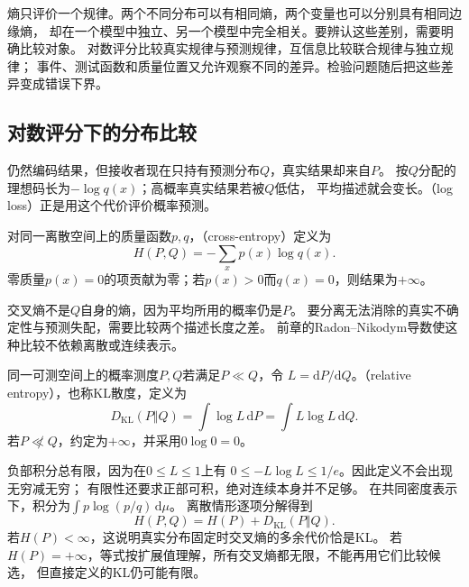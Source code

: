 熵只评价一个规律。两个不同分布可以有相同熵，两个变量也可以分别具有相同边缘熵，
却在一个模型中独立、另一个模型中完全相关。要辨认这些差别，需要明确比较对象。
对数评分比较真实规律与预测规律，互信息比较联合规律与独立规律；
事件、测试函数和质量位置又允许观察不同的差异。检验问题随后把这些差异变成错误下界。

\subsection{对数评分下的分布比较}
\label{sec:information-log-score-kl}

仍然编码结果，但接收者现在只持有预测分布\(Q\)，真实结果却来自\(P\)。
按\(Q\)分配的理想码长为\(-\log q(x)\)；高概率真实结果若被\(Q\)低估，
平均描述就会变长。（log loss）正是用这个代价评价概率预测。

\begin{definition}[离散交叉熵]
\label{def:information-cross-entropy}
对同一离散空间上的质量函数\(p,q\)，（cross-entropy）定义为
\begin{equation}
  H(P,Q)=-\sum_xp(x)\log q(x).
  \label{eq:information-cross-entropy}
\end{equation}
零质量\(p(x)=0\)的项贡献为零；若\(p(x)>0\)而\(q(x)=0\)，则结果为\(+\infty\)。
\end{definition}

交叉熵不是\(Q\)自身的熵，因为平均所用的概率仍是\(P\)。
要分离无法消除的真实不确定性与预测失配，需要比较两个描述长度之差。
前章的Radon--Nikodym导数使这种比较不依赖离散或连续表示。

\begin{definition}[相对熵]
\label{def:information-kl-divergence}
同一可测空间上的概率测度\(P,Q\)若满足\(P\ll Q\)，令
\(L=\mathrm dP/\mathrm dQ\)。（relative entropy），也称KL散度，定义为
\begin{equation}
  D_{\mathrm{KL}}(P\Vert Q)
  =\int\log L\,\mathrm dP=\int L\log L\,\mathrm dQ.
  \label{eq:information-kl-divergence}
\end{equation}
若\(P\not\ll Q\)，约定为\(+\infty\)，并采用\(0\log0=0\)。
\end{definition}

负部积分总有限，因为在\(0\leq L\leq1\)上有
\(0\leq-L\log L\leq1/e\)。因此定义不会出现无穷减无穷；
有限性还要求正部可积，绝对连续本身并不足够。
在共同密度表示下，积分为\(\int p\log(p/q)\,\mathrm d\mu\)。
离散情形逐项分解得到
\begin{equation}
  H(P,Q)=H(P)+D_{\mathrm{KL}}(P\Vert Q).
  \label{eq:information-cross-entropy-decomposition}
\end{equation}
若\(H(P)<\infty\)，这说明真实分布固定时交叉熵的多余代价恰是KL。
若\(H(P)=+\infty\)，等式按扩展值理解，所有交叉熵都无限，不能再用它们比较候选，
但直接定义的KL仍可能有限。

